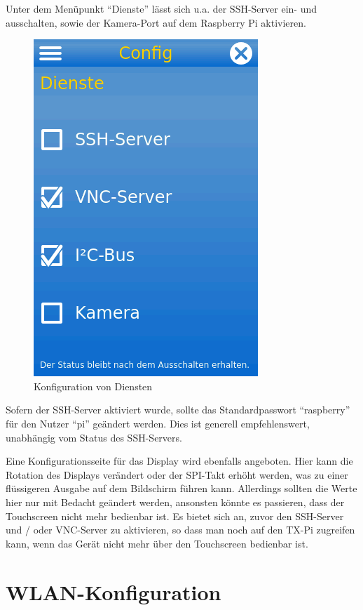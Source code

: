 \documentclass[
  paper=A4,
  ngerman,
  fontsize=12pt,
  parskip=half-,
]{scrbook}
\begin{document}
Unter dem Menüpunkt "`Dienste"' lässt sich u.a. der SSH-Server ein- und ausschalten,
sowie der Kamera-Port auf dem Raspberry Pi aktivieren. 

\begin{figure}[ht]
\centering
\includegraphics[scale=0.4]{images/config-services.png}
\caption{Konfiguration von Diensten}
\end{figure}

Sofern der SSH-Server aktiviert wurde, sollte das Standardpasswort "`raspberry"'
für den Nutzer "`pi"' geändert werden. Dies ist generell empfehlenswert, unabhängig vom
Status des SSH-Servers.

Eine Konfigurationsseite für das Display wird ebenfalls angeboten. Hier kann die 
Rotation des Displays verändert oder der SPI-Takt erhöht werden, was zu einer
flüssigeren Ausgabe auf dem Bildschirm führen kann. Allerdings sollten die 
Werte hier nur mit Bedacht geändert werden, ansonsten könnte es passieren, dass 
der Touchscreen nicht mehr bedienbar ist. Es bietet sich an, zuvor den SSH-Server und /
oder VNC-Server zu aktivieren, so dass man noch auf den TX-Pi zugreifen kann, wenn das
Gerät nicht mehr über den Touchscreen bedienbar ist.


\section{WLAN-Konfiguration}
\label{sec:wlan}
\end{document}
